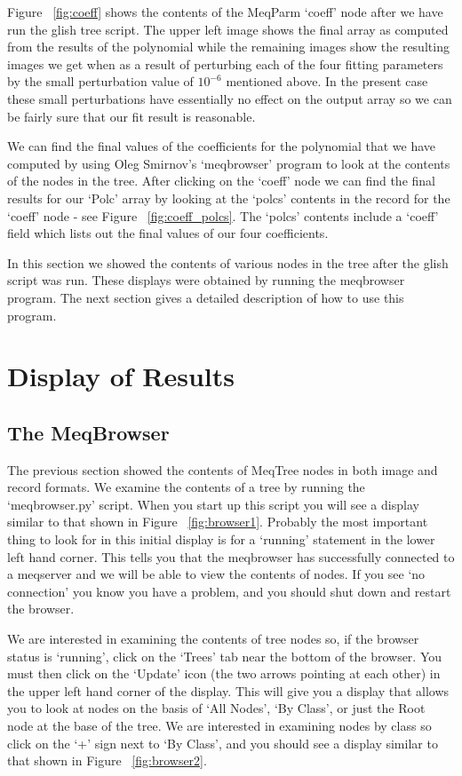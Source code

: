 \documentclass[10pt]{article}
\begin{document}
Figure ~\ref{fig:coeff} shows the contents of the MeqParm `coeff'
node after we have run the glish tree script. The upper left image
shows the final array as computed from the results of the polynomial
while the remaining images show the resulting images we get when
as a result of perturbing each of the four fitting parameters by 
the small perturbation value of $10^{-6}$ mentioned above.
In the present case these small perturbations have essentially
no effect on the output array so we can be fairly sure that our
fit result is reasonable.
 
We can find the final values of the coefficients for the polynomial
that we have computed by using Oleg Smirnov's `meqbrowser' program to look at
the contents of the nodes in the tree. After clicking on the `coeff' node
we can find the final results for our `Polc' array by looking at the 
`polcs' contents in the record for the `coeff' node - see 
Figure  ~\ref{fig:coeff_polcs}. The `polcs' contents include a `coeff' field
which lists out the final values of our four coefficients. 

In this section we showed the contents of various nodes in the 
tree after the glish script was run. These displays were obtained
by running the meqbrowser program. The next section gives a detailed
description of how to use this program.

\section{Display of Results}

\subsection {The MeqBrowser}

The previous section showed the contents of MeqTree nodes in both 
image and record formats. We examine the contents of a tree
by running the `meqbrowser.py' script. When you start up this script
you will see a display similar to that shown in 
Figure  ~\ref{fig:browser1}. Probably the most important thing to
look for in this initial display is for a `running' statement in the
lower left hand corner. This tells you that the meqbrowser has
successfully connected to a meqserver and we will be able to view
the contents of nodes. If you see `no connection' you know you have a
problem, and you should shut down and restart the browser.

We are interested in examining the contents of tree nodes so, if the
browser status is `running', click on the `Trees' tab near the
bottom of the browser. You must then click on the `Update' icon
(the two arrows pointing at each other) in the upper left hand
corner of the display. This will give you a display that allows you
to look at nodes on the basis of `All Nodes', `By Class', or just 
the Root node at the base of the tree. 
We are interested in examining nodes by class so click
on the `+' sign next to `By Class', and you should see a display
similar to that shown in Figure  ~\ref{fig:browser2}. 
\end{document}
